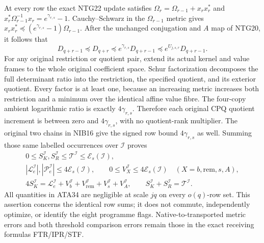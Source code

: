 \documentclass[11pt,a4paper]{article}
\begin{document}
At every row the exact NTG22 update satisfies
$\Omega_r=\Omega_{r-1}+x_rx_r^*$ and
$x_r^*\Omega_{r-1}^{-1}x_r=e^{\gamma_{r,s}}-1$.
Cauchy--Schwarz in the $\Omega_{r-1}$ metric gives
$x_rx_r^*\preceq(e^{\gamma_{r,s}}-1)\Omega_{r-1}$.
After the unchanged conjugation and $A$ map of NTG20, it follows that
\[
 D_{q+r-1}\preceq D_{q+r}
        \preceq e^{\gamma_{r,s}}D_{q+r-1}
        \preceq e^{U_{j,s,r}}D_{q+r-1}.                 \tag{ATA33}
\]
For any original restriction or quotient pair, extend its actual
kernel and value frames to the whole original coefficient space.
Schur factorization decomposes the full determinant ratio into the
restriction, the specified quotient, and its exterior quotient.
Every factor is at least one, because an increasing metric increases
both restriction and a minimum over the identical affine value fibre.
The four-copy ambient logarithmic ratio is exactly $4\gamma_{r,s}$.
Therefore each original CPQ quotient increment is between zero and
$4\gamma_{r,s}$, with no quotient-rank multiplier.  The original
two chains in NIB16 give the signed row bound $4\gamma_{r,s}$ as
well.  Summing those same labelled occurrences over $\mathscr I$
proves
\[
\begin{gathered}
 0\le S_K^{\mathscr I},S_R^{\mathscr I}
       \le\mathcal T^{\mathscr I}\le\mathcal E_s(\mathscr I),\\
 |\mathcal L_e^{\mathscr I}|,|\mathcal P_e^{\mathscr I}|
          \le4\mathcal E_s(\mathscr I),\qquad
 0\le V_X^{\mathscr I}\le4\mathcal E_s(\mathscr I)
                       \quad(X=b,\mathrm{rem},s,A),\\
 4S_K^{\mathscr I}=\mathcal L_e^{\mathscr I}
       +V_b^{\mathscr I}+V_{\mathrm{rem}}^{\mathscr I}
       +V_s^{\mathscr I}+V_A^{\mathscr I},\qquad
 S_K^{\mathscr I}+S_R^{\mathscr I}=\mathcal T^{\mathscr I}.
\end{gathered}\tag{ATA34}
\]
All quantities in ATA34 are negligible at scale $jq$ on every
$o(q)$-row set.  This assertion concerns the identical row sums;
it does not commute, independently optimize, or identify the eight
programme flags.  Native-to-transported metric errors and both
threshold comparison errors remain those in the exact receiving
formulas FTR/IPR/STF.
\end{document}
